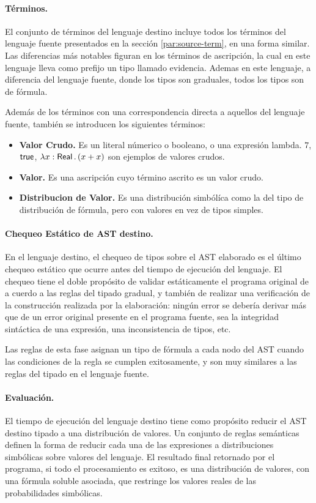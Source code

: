 \paragraph{Términos.}\label{par:tplc-terms} El conjunto de términos del lenguaje destino incluye todos los términos del lenguaje fuente presentados en la sección \ref{par:source-term}, en una forma similar. Las diferencias más notables figuran en los términos de ascripción, la cual en este lenguaje lleva como prefijo un tipo llamado evidencia. Ademas en este lenguaje, a diferencia del lenguaje fuente, donde los tipos son graduales, todos los tipos son de fórmula.

Además de los términos con una correspondencia directa a aquellos del lenguaje fuente, también se introducen los siguientes términos:
\begin{itemize}
\item \textbf{Valor Crudo.} Es un literal númerico o booleano, o una expresión lambda. $7$, $\mathord{\text{\sffamily true}}$, $\lambda {x} : {\mathord{\text{\sffamily Real}}} \,.\, {(x + x)}$ son ejemplos de valores crudos.
\item \textbf{Valor.} Es una ascripción cuyo término ascrito es un valor crudo.
\item \textbf{Distribucion de Valor.} Es una distribución simbólíca como la del tipo de distribución de fórmula, pero con valores en vez de tipos simples.
\end{itemize}

\paragraph{Chequeo Estático de AST destino.} En el lenguaje destino, el chequeo de tipos sobre el AST elaborado es el último chequeo estático que ocurre antes del tiempo de ejecución del lenguaje. El chequeo tiene el doble propósito de validar estáticamente el programa original de a cuerdo a las reglas del tipado gradual, y también de realizar una verificación de la construcción realizada por la elaboración: ningún error se debería derivar más que de un error original presente en el programa fuente, sea la integridad sintáctica de una expresión, una inconsistencia de tipos, etc.

Las reglas de esta fase asignan un tipo de fórmula a cada nodo del AST cuando las condiciones de la regla se cumplen exitosamente, y son muy similares a las reglas del tipado en el lenguaje fuente.

\paragraph{Evaluación.} El tiempo de ejecución del lenguaje destino tiene como propósito reducir el AST destino tipado a una distribución de valores. Un conjunto de reglas semánticas definen la forma de reducir cada una de las expresiones a distribuciones simbólicas sobre valores del lenguaje. El resultado final retornado por el programa, si todo el procesamiento es exitoso, es una distribución de valores, con una fórmula soluble asociada, que restringe los valores reales de las probabilidades simbólicas.

